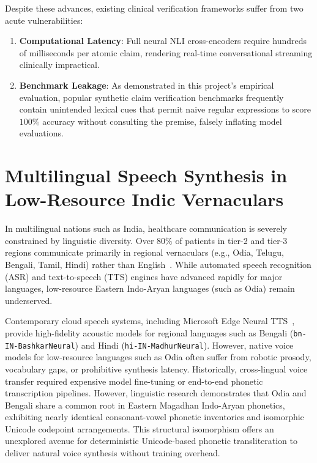 Despite these advances, existing clinical verification frameworks suffer from two acute vulnerabilities:
\begin{enumerate}
    \item \textbf{Computational Latency}: Full neural NLI cross-encoders require hundreds of milliseconds per atomic claim, rendering real-time conversational streaming clinically impractical.
    \item \textbf{Benchmark Leakage}: As demonstrated in this project's empirical evaluation, popular synthetic claim verification benchmarks frequently contain unintended lexical cues that permit naive regular expressions to score $100\%$ accuracy without consulting the premise, falsely inflating model evaluations.
\end{enumerate}


\section{Multilingual Speech Synthesis in Low-Resource Indic Vernaculars}
\label{sec:lit_indic_speech}

In multilingual nations such as India, healthcare communication is severely constrained by linguistic diversity. Over $80\%$ of patients in tier-2 and tier-3 regions communicate primarily in regional vernaculars (e.g., Odia, Telugu, Bengali, Tamil, Hindi) rather than English~\cite{kumar2023linguistic}. While automated speech recognition (ASR) and text-to-speech (TTS) engines have advanced rapidly for major languages, low-resource Eastern Indo-Aryan languages (such as Odia) remain underserved.

Contemporary cloud speech systems, including Microsoft Edge Neural TTS~\cite{microsoft2024edgetts}, provide high-fidelity acoustic models for regional languages such as Bengali (\texttt{bn\allowbreak-IN\allowbreak-Bashkar\allowbreak Neural}) and Hindi (\texttt{hi\allowbreak-IN\allowbreak-Madhur\allowbreak Neural}). However, native voice models for low-resource languages such as Odia often suffer from robotic prosody, vocabulary gaps, or prohibitive synthesis latency. Historically, cross-lingual voice transfer required expensive model fine-tuning or end-to-end phonetic transcription pipelines. However, linguistic research demonstrates that Odia and Bengali share a common root in Eastern Magadhan Indo-Aryan phonetics, exhibiting nearly identical consonant-vowel phonetic inventories and isomorphic Unicode codepoint arrangements. This structural isomorphism offers an unexplored avenue for deterministic Unicode-based phonetic transliteration to deliver natural voice synthesis without training overhead.


